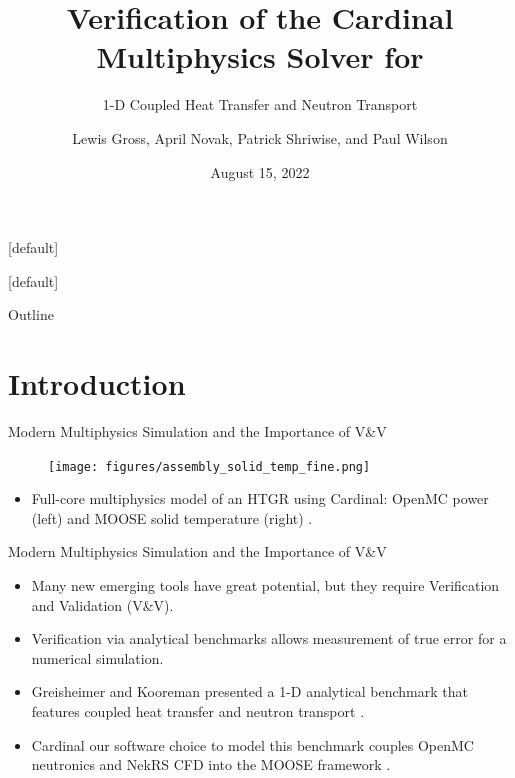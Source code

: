\documentclass[9pt,t]{beamer}
\title{Verification of the Cardinal Multiphysics Solver for}
\subtitle{1-D Coupled Heat Transfer and Neutron Transport}
\author{Lewis Gross, April Novak, Patrick Shriwise, and Paul Wilson\vspace*{-1cm}}
\date{August 15, 2022}
\makeatletter
\newenvironment{withoutheadline}{
       \setbeamertemplate{headline}[default]
       \def\beamer@entrycode{\vspace*{-\headheight}}
    }{}
\makeatother
\begin{document}
\begin{withoutheadline}
\begin{frame}[plain] %
    \maketitle
\end{frame}
\end{withoutheadline}

\begin{withoutheadline}
\begin{frame}{Outline}
  \tableofcontents
\end{frame}
\end{withoutheadline}


\section{Introduction}
\begin{frame}{Modern Multiphysics Simulation and the Importance of V\&V}
    \begin{figure}[H]
        \centering
        \texttt{[image: figures/assembly\_solid\_temp\_fine.png]}
    \end{figure}
    \begin{itemize}
        \item Full-core multiphysics model of an HTGR using Cardinal: OpenMC power (left) and MOOSE solid temperature (right) \cite{novak2022-cardinal}.
    \end{itemize}
\end{frame}

\begin{frame}{Modern Multiphysics Simulation and the Importance of V\&V}
    \pause
    \begin{itemize}
        \item <2-> Many new emerging tools have great potential, but they require Verification and Validation (V\&V).
        \item <3-> Verification via analytical benchmarks allows measurement of true error for a numerical simulation.
        \item <4-> Greisheimer and Kooreman presented a 1-D analytical benchmark that features coupled heat transfer and neutron transport \cite{analytical-benchmark}.
        \item <5-> Cardinal \cite{novak2022-cardinal} our software choice to model this benchmark couples OpenMC \cite{openmc} neutronics and NekRS \cite{nekrs} CFD into the MOOSE framework \cite{lindsay2022moose}.
    \end{itemize}
\end{frame}
\end{document}
